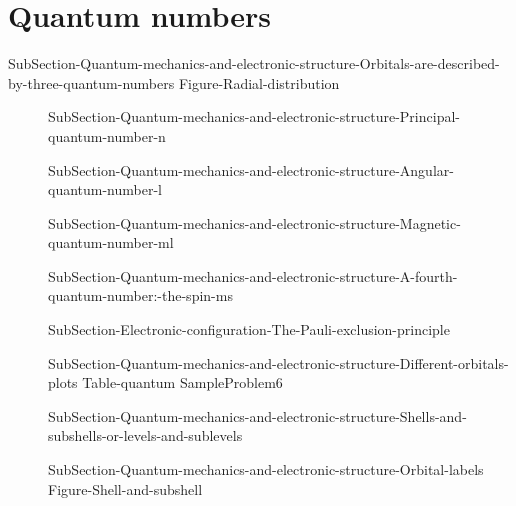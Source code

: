 \documentclass[main.tex]{subfiles}
\newcommand\chapterlabel{Ch-radiation}\setcounter{figurenewcounter}{0}\setcounter{tablenewcounter}{0}\setcounter{formulanewcounter}{0}\chapterpicture{../{\chapterlabel}/figure1}\chapterpicturelabel{PngImg}
\begin{document}
\section{Quantum numbers}{SubSection-Quantum-mechanics-and-electronic-structure-Orbitals-are-described-by-three-quantum-numbers}
 {Figure-Radial-distribution}  
\sloppy\begin{description}
\item[]{SubSection-Quantum-mechanics-and-electronic-structure-Principal-quantum-number-n}
\item[]{SubSection-Quantum-mechanics-and-electronic-structure-Angular-quantum-number-l}
\item[]{SubSection-Quantum-mechanics-and-electronic-structure-Magnetic-quantum-number-ml}
\item[] {SubSection-Quantum-mechanics-and-electronic-structure-A-fourth-quantum-number:-the-spin-ms}
\item[] {SubSection-Electronic-configuration-The-Pauli-exclusion-principle}
\item[]{SubSection-Quantum-mechanics-and-electronic-structure-Different-orbitals-plots}
{Table-quantum}
{SampleProblem6}
\item[] {SubSection-Quantum-mechanics-and-electronic-structure-Shells-and-subshells-or-levels-and-sublevels}
\item[] {SubSection-Quantum-mechanics-and-electronic-structure-Orbital-labels}
 {Figure-Shell-and-subshell}
\end{description}

 
\end{document}
